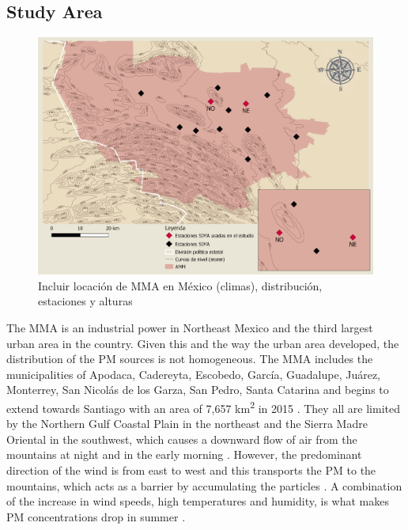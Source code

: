 \subsection{Study Area}
\begin{figure}[H]
    \centering
    \includegraphics[scale=0.15]{images/map.png}
    \caption{Incluir locación de MMA en México (climas), distribución, estaciones y alturas}
    \label{fig:map}
\end{figure}
The MMA is an industrial power in Northeast Mexico and the third largest urban area in the country.
Given this and the way the urban area developed, the distribution of the PM sources is not homogeneous.
The MMA includes the municipalities of Apodaca, Cadereyta, Escobedo, García, Guadalupe, Juárez, Monterrey,
San Nicolás de los Garza, San Pedro, Santa Catarina and begins to extend towards Santiago with an area of 7,657
km\textsuperscript{2} in 2015 \cite{inegi2015}. They all are limited by the Northern Gulf Coastal Plain
in the northeast and the Sierra Madre Oriental in the southwest, which causes a downward flow of
air from the mountains at night and in the early morning \cite{molina2019}. However, the predominant
direction of the wind is from east to west and this transports the PM to the mountains, which acts as a barrier
by accumulating the particles \cite{gonzalez2011}. A combination of the increase in wind speeds,
high temperatures and humidity, is what makes PM concentrations drop in summer
\cite{gonzalez2011,sima2019}.

